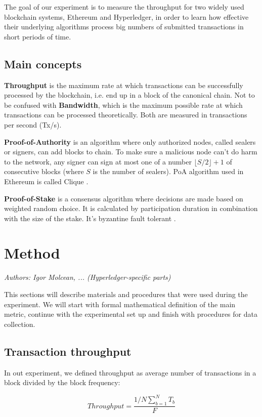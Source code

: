 \documentclass[12pt]{article}
\begin{document}
The goal of our experiment is to measure the throughput for two widely used blockchain systems, Ethereum and Hyperledger, in order to learn how effective their underlying algorithms process big numbers of submitted transactions in short periods of time.

\subsection{Main concepts}

\textbf{Throughput} is the maximum rate at which transactions can be successfully processed by the blockchain, i.e. end up in a block of the canonical chain. Not to be confused with \textbf{Bandwidth}, which is the maximum possible rate at which transactions can be processed theoretically. Both are measured in transactions per second (Tx/s).

\textbf{Proof-of-Authority} is an algorithm where only authorized nodes, called sealers or signers, can add blocks to chain. To make sure a malicious node can’t do harm to the network, any signer can sign at most one of a number $\lfloor S/2 \rfloor + 1$ of consecutive blocks (where $S$ is the number of sealers). PoA algorithm used in Ethereum is called Clique \cite{clique}.

\textbf{Proof-of-Stake} is a consensus algorithm where decisions are made based on weighted random choice. It is calculated by participation duration in combination with the size of the stake. It’s byzantine fault tolerant \cite{pos}.


\section{Method}
\textit{Authors: Igor Molcean, ... (Hyperledger-specific parts)}

This sections will describe materials and procedures that were used during the experiment. We will start with formal mathematical definition of the main metric, continue with the experimental set up and finish with procedures for data collection.

\subsection{Transaction throughput} \label{throughput}
In out experiment, we defined throughput as average number of transactions in a block divided by the block frequency:

$$Throughput = \frac{1/N \sum_{b=1}^{N} T_b}{F}$$
\end{document}
